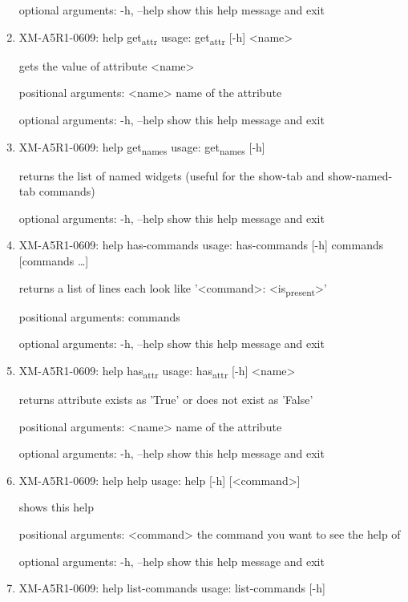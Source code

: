\documentclass[11pt]{article}
\begin{document}
\begin{enumerate}
optional arguments:
  -h, --help  show this help message and exit

\item XM-A5R1-0609: help get\textsubscript{attr}
\label{sec:org9e7dee9}
usage: get\textsubscript{attr} [-h] <name>

gets the value of attribute <name>

positional arguments:
  <name>      name of the attribute

optional arguments:
  -h, --help  show this help message and exit

\item XM-A5R1-0609: help get\textsubscript{names}
\label{sec:org8d1f2ce}
usage: get\textsubscript{names} [-h]

returns the list of named widgets (useful for the show-tab and show-named-tab
commands)

optional arguments:
  -h, --help  show this help message and exit

\item XM-A5R1-0609: help has-commands
\label{sec:orgf15cc7a}
usage: has-commands [-h] commands [commands \ldots{}]

returns a list of lines each look like '<command>: <is\textsubscript{present}>'

positional arguments:
  commands

optional arguments:
  -h, --help  show this help message and exit

\item XM-A5R1-0609: help has\textsubscript{attr}
\label{sec:org086755d}
usage: has\textsubscript{attr} [-h] <name>

returns attribute exists as 'True' or does not exist as 'False'

positional arguments:
  <name>      name of the attribute

optional arguments:
  -h, --help  show this help message and exit

\item XM-A5R1-0609: help help
\label{sec:org576f3ed}
usage: help [-h] [<command>]

shows this help

positional arguments:
  <command>   the command you want to see the help of

optional arguments:
  -h, --help  show this help message and exit

\item XM-A5R1-0609: help list-commands
\label{sec:orgf9fba7e}
usage: list-commands [-h]


\end{enumerate}
\end{document}

